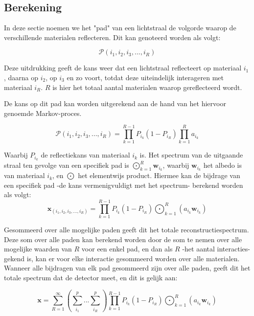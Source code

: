 \documentclass[12pt]{report}
\DeclareMathOperator*{\Odot}{\bigodot}
\begin{document}
\subsection{Berekening}

In deze sectie noemen we het "pad" van een lichtstraal de volgorde waarop de verschillende materialen reflecteren. Dit kan genoteerd worden als volgt:

\begin{equation}
\mathcal{P}(i_1,i_2,i_3,...,i_R)
\end{equation}

Deze uitdrukking geeft de kans weer dat een lichtstraal reflecteert op materiaal $i_1$, daarna op $i_2$, op $i_3$ en zo voort, totdat deze uiteindelijk interageren met materiaal $i_R$. $R$ is hier het totaal aantal materialen waarop gereflecteerd wordt.

De kans op dit pad kan worden uitgerekend aan de hand van het hiervoor genoemde Markov-proces\cite{mlinmix}. 

\begin{equation}
\mathcal{P}(i_1,i_2,i_3,...,i_R) = \prod_{k=1}^{R-1} P_{i_k} \left(1-P_{i_R}\right) \prod_{k=1}^R a_{i_k}
\end{equation}

Waarbij $P_{i_k}$ de reflectiekans van materiaal $i_k$ is. Het spectrum van de uitgaande straal ten gevolge van een specifiek pad is $\Odot_{k=1}^R \bm{w}_{i_k}$, waarbij $\bm{w}_{i_k}$ het albedo is van materiaal $i_k$, en $\Odot$ het elementwijs product. Hiermee kan de bijdrage van een specifiek pad -de kans vermenigvuldigt met het spectrum- berekend worden als volgt:
\begin{equation}
\bm{x}_{(i_1,i_2,i_3,...,i_R)} = \prod_{k=1}^{R-1} P_{i_k} \left(1-P_{i_R}\right) \Odot_{k=1}^R \left(a_{i_k} \bm{w}_{i_k}\right)
\end{equation}

Gesommeerd over alle mogelijke paden geeft dit het totale reconstructiespectrum. Deze som over alle paden kan berekend worden door de som te nemen over alle mogelijke waarden van $R$ voor een enkel pad, en dan als $R$ -het aantal interacties- gekend is, kan er voor elke interactie gesommeerd worden over alle materialen. Wanneer alle bijdragen van elk pad gesommeerd zijn over alle paden, geeft dit het totale spectrum dat de detector meet, en dit is gelijk aan:

\begin{equation}
\bm{x} = \sum_{R=1}^{\infty} \left(\sum_{i_1}^{p} ... \sum_{i_R}^{p}\right)\prod_{k=1}^{R-1} P_{i_k} \left(1-P_{i_R}\right)  \Odot_{k=1}^R \left(a_{i_k} \bm{w}_{i_k}\right)
\end{equation}
\end{document}
